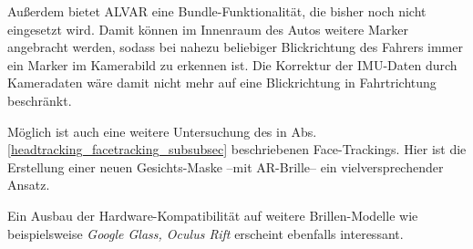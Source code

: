 Außerdem bietet ALVAR eine Bundle-Funktionalität, die bisher noch nicht eingesetzt wird.
Damit können im Innenraum des Autos weitere Marker angebracht werden, sodass bei nahezu beliebiger Blickrichtung des Fahrers immer ein Marker im Kamerabild zu erkennen ist.
Die Korrektur der \ac{IMU}-Daten durch Kameradaten wäre damit nicht mehr auf eine Blickrichtung in Fahrtrichtung beschränkt.

Möglich ist auch eine weitere Untersuchung des in Abs. \ref{headtracking_facetracking_subsubsec} beschriebenen Face-Trackings.
Hier ist die Erstellung einer neuen Gesichts-Maske --mit \ac{AR}-Brille-- ein vielversprechender Ansatz.

Ein Ausbau der Hardware-Kompatibilität auf weitere Brillen-Modelle wie beispielsweise \emph{Google Glass, Oculus Rift} \oae erscheint ebenfalls interessant.


